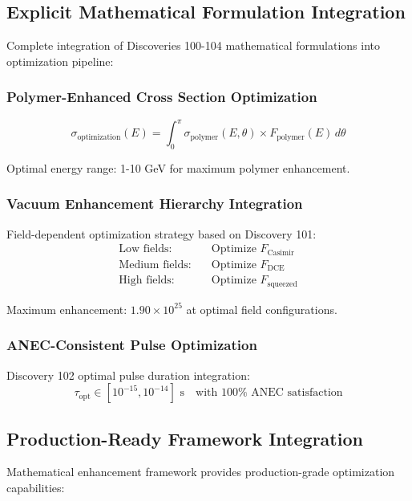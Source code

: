 \documentclass[11pt,a4paper]{article}
\begin{document}
\subsection{Explicit Mathematical Formulation Integration}

Complete integration of Discoveries 100-104 mathematical formulations into optimization pipeline:

\subsubsection{Polymer-Enhanced Cross Section Optimization}
\begin{equation}
\sigma_{\text{optimization}}(E) = \int_0^{\pi} \sigma_{\text{polymer}}(E,\theta) \times F_{\text{polymer}}(E) \, d\theta
\end{equation}

Optimal energy range: 1-10 GeV for maximum polymer enhancement.

\subsubsection{Vacuum Enhancement Hierarchy Integration}
Field-dependent optimization strategy based on Discovery 101:
\begin{align}
\text{Low fields:} \quad &\text{Optimize } F_{\text{Casimir}} \\
\text{Medium fields:} \quad &\text{Optimize } F_{\text{DCE}} \\
\text{High fields:} \quad &\text{Optimize } F_{\text{squeezed}}
\end{align}

Maximum enhancement: $1.90 \times 10^{25}$ at optimal field configurations.

\subsubsection{ANEC-Consistent Pulse Optimization}
Discovery 102 optimal pulse duration integration:
\begin{equation}
\tau_{\text{opt}} \in [10^{-15}, 10^{-14}] \text{ s} \quad \text{with } 100\% \text{ ANEC satisfaction}
\end{equation}

\subsection{Production-Ready Framework Integration}

Mathematical enhancement framework provides production-grade optimization capabilities:
\end{document}
